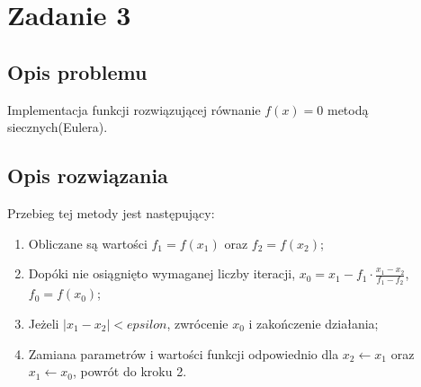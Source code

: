 \documentclass{classrep}
\begin{document}
\section{Zadanie 3}
	\subsection{Opis problemu}
		Implementacja funkcji rozwiązującej równanie $f(x)=0$ metodą siecznych(Eulera).
	
	\subsection{Opis rozwiązania}		
		Przebieg tej metody jest następujący:
		\begin{enumerate}
			\item Obliczane są wartości $f_1=f(x_1)$ oraz $f_2=f(x_2)$;
			\item Dopóki nie osiągnięto wymaganej liczby iteracji, $x_0=x_1-f_1 \cdot \frac{x_1-x_2}{f_1-f_2}$, $f_0=f(x_0)$;
			\item Jeżeli $|x_1-x_2|<epsilon$, zwrócenie $x_0$ i zakończenie działania;
			\item Zamiana parametrów i wartości funkcji odpowiednio dla $x_2 \leftarrow x_1$ oraz $x_1 \leftarrow x_0$, powrót do kroku 2.
		\end{enumerate}
		
\end{document}
